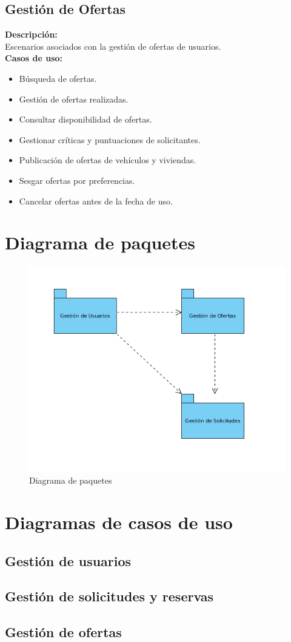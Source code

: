\subsection{Gestión de Ofertas}
\textbf{Descripción:}\\
Escenarios asociados con la gestión de ofertas de usuarios.\\
\textbf{Casos de uso:}\\
	\begin{itemize}
		\item Búsqueda de ofertas.
		\item Gestión de ofertas realizadas.
		\item	Consultar disponibilidad de ofertas.
		\item Gestionar críticas y puntuaciones de solicitantes.
		\item Publicación de ofertas de vehículos y viviendas.
		\item Sesgar ofertas por preferencias.
		\item Cancelar ofertas antes de la fecha de uso.											
	\end{itemize}

\section{Diagrama de paquetes}
\begin{figure}[H] 
\centering
\includegraphics[scale=0.7]{Diagrama_de_paquetes.png}  
\caption{Diagrama de paquetes} \label{fig:figura1}
\end{figure}

\section{Diagramas de casos de uso}
\subsection{Gestión de usuarios}
\subsection{Gestión de solicitudes y reservas}
\subsection{Gestión de ofertas}

